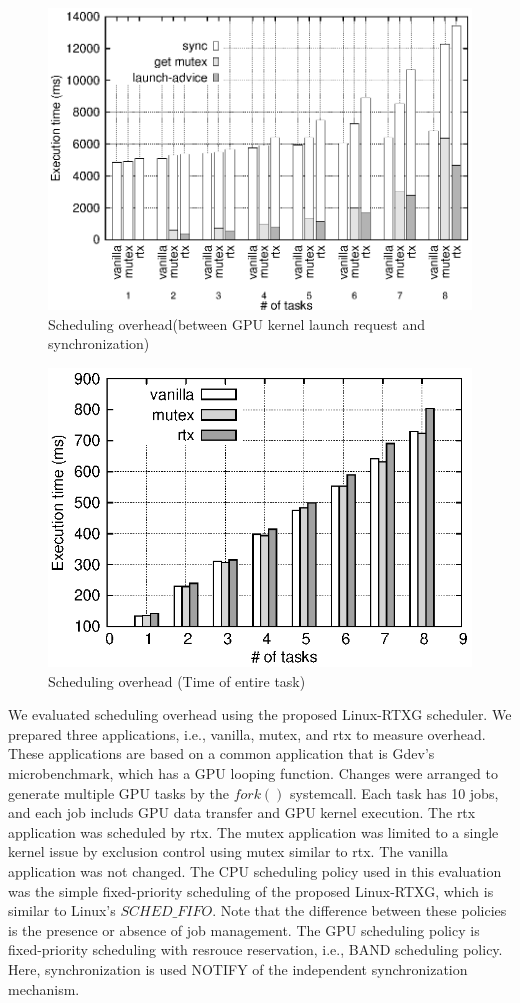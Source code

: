 \begin{figure}[t]
\begin{center}
\includegraphics[width=1.5\textwidth]{img/sum_task_fp.eps}
\caption{Scheduling overhead(between GPU kernel launch request and synchronization)}
\label{fig:fp_overhead}
\end{center}
\end{figure}
\fi

\begin{figure}[t]
\begin{center}
\includegraphics[width=.44\textwidth]{img/sum_task.eps}
\caption{Scheduling overhead (Time of entire task)}
\label{fig:fp_task_overhead}
\end{center}
\end{figure}

We evaluated scheduling overhead using the proposed Linux-RTXG scheduler.
We prepared three applications, i.e., vanilla, mutex, and rtx to measure overhead.
These applications are based on a common application that is Gdev’s microbenchmark, which has a GPU looping function.
Changes were arranged to generate multiple GPU tasks by the $fork()$ systemcall.
Each task has 10 jobs, and each job includs GPU data transfer and GPU kernel execution.
The rtx application was scheduled by rtx.
The mutex application was limited to a single kernel issue by exclusion control using mutex similar to rtx.
The vanilla application was not changed.
The CPU scheduling policy used in this evaluation was the simple fixed-priority scheduling of the proposed Linux-RTXG, which is similar to Linux’s $SCHED\_FIFO$. Note that the difference between these policies is the presence or absence of job management.
The GPU scheduling policy is fixed-priority scheduling with resrouce reservation, i.e., BAND scheduling policy.
Here, synchronization is used NOTIFY of the independent synchronization mechanism.

